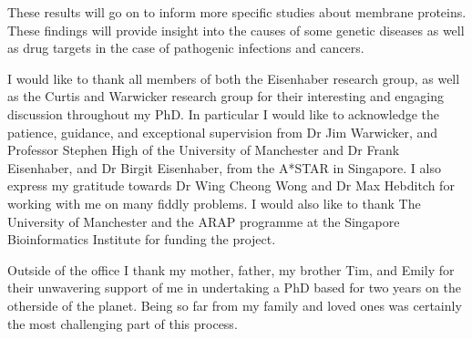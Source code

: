 \documentclass[12pt,PhD,twoside]{muthesis}
\begin{document}
These results will go on to inform more specific studies about membrane proteins.
These findings will provide insight into the causes of some genetic diseases as well as drug targets in the case of pathogenic infections and cancers.






\afterabstract{} %

I would like to thank all members of both the Eisenhaber research group, as well as the Curtis and Warwicker research group for their interesting and engaging discussion throughout my PhD.
In particular I would like to acknowledge the patience, guidance, and exceptional supervision from Dr Jim Warwicker, and Professor Stephen High of the University of Manchester and Dr Frank Eisenhaber, and Dr Birgit Eisenhaber, from the A*STAR in Singapore.
I also express my gratitude towards Dr Wing Cheong Wong and Dr Max Hebditch for working with me on many fiddly problems.
I would also like to thank The University of Manchester and the ARAP programme at the Singapore Bioinformatics Institute for funding the project.

Outside of the office I thank my mother, father, my brother Tim, and Emily for their unwavering support of me in undertaking a PhD based for two years on the otherside of the planet.
Being so far from my family and loved ones was certainly the most challenging part of this process.




\end{document}
